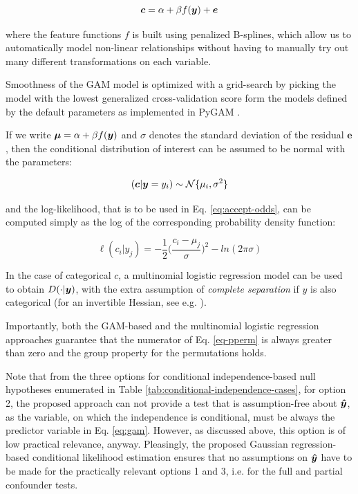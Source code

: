 \documentclass{article}
\begin{document}
\begin{equation}
    \label{eq:gam}
    \boldsymbol{c} = \alpha + \beta f(\boldsymbol{y}) + \boldsymbol{e}
\end{equation}

where the feature functions $f$ is built using penalized B-splines, which allow us to automatically model non-linear relationships without having to manually try out many different transformations on each variable.

Smoothness of the GAM model is optimized with a grid-search by picking the model with the lowest generalized cross-validation score form the models defined by the default parameters as implemented in PyGAM \citep{serven2018generalized}.

If we write $\boldsymbol{\mu} = \alpha + \beta f(\boldsymbol{y})$ and $\sigma$ denotes the standard deviation of the residual $\boldsymbol{e}$, then the conditional distribution of interest can be assumed to be normal with the parameters:

$$ (\boldsymbol{c}|\boldsymbol{y}=y_i) \sim \mathcal{N}\{\mu_i, \sigma^2\}$$

and the log-likelihood, that is to be used in Eq. \ref{eq:accept-odds}, can be computed simply as the log of the corresponding probability density function:

$$ \ell(c_i|y_j) = - \frac{1}{2} \Big(\frac{c_i-\mu_j}{\sigma}\Big)^2 - ln(2 \pi \sigma)   $$

In the case of categorical $c$, a multinomial logistic regression model can be used to obtain $D(\cdot|\boldsymbol{y})$, with the extra assumption of \emph{complete separation} if $y$ is also categorical (for an invertible Hessian, see e.g. \citep{bennett1966multiple, jones1975proability}).

Importantly, both the GAM-based and the multinomial logistic regression approaches guarantee that the numerator of Eq. \ref{eq-pperm} is always greater than zero and the group property for the permutations holds.

Note that from the three options for conditional independence-based null hypotheses enumerated in Table \ref{tab:conditional-independence-cases}, for option 2, the proposed approach can not provide a test that is assumption-free about $\boldsymbol{\hat{y}}$, as the variable, on which the independence is conditional, must be always the predictor variable in Eq. \ref{eq:gam}. However, as discussed above, this option is of low practical relevance, anyway.
Pleasingly,  the proposed Gaussian regression-based conditional likelihood estimation ensures that no assumptions on $\boldsymbol{\hat{y}}$ have to be made for the practically relevant options 1 and 3, i.e. for the full and partial confounder tests.
\end{document}
